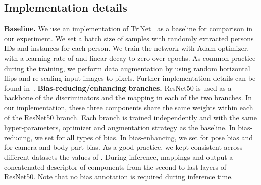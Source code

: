 \documentclass[10pt,twocolumn,letterpaper]{article}
\begin{document}
\subsection{Implementation details}
\noindent\textbf{Baseline.} We use an implementation of TriNet~\cite{hermans2017defense} as a baseline for comparison in our experiment.
We set a batch size of  samples with  randomly extracted persons IDs and  instances for each person. We train the network with Adam optimizer, with a learning rate of  and linear decay to zero over  epochs. As common practice during the training, we perform data augmentation by using random horizontal flips and re-scaling input images to  pixels. 
Further implementation details can be found in~\cite{hermans2017defense}.\newline
\noindent\textbf{Bias-reducing/enhancing branches.}  ResNet50 is used as a backbone of  the discriminators   and the mapping  in each  of the two branches. In our implementation, these three components share the same weights within each of the ResNet50 branch. 
Each branch is trained independently and with the same hyper-parameters, optimizer and augmentation strategy as the baseline. {In bias-reducing, we set  for all types of bias. In bias-enhancing, we set  for pose bias and  for camera and body part bias. As a good practice, we kept consistent across different datasets the values of .
During inference, mappings  and  output a concatenated descriptor of  components from the-second-to-last layers of ResNet50.} Note that no bias annotation is required during inference time.
\newline
\end{document}
